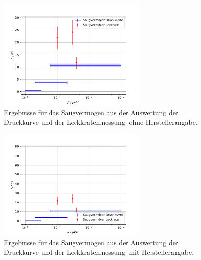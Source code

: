 \begin{figure}[h]
  \centering
  \includegraphics[width=0.65\textwidth]{../Messdaten/plots/turbo/turbo_leck_und_druck_ohne_hersteller.pdf}
  \caption{Ergebnisse für das Saugvermögen aus der Auswertung der Druckkurve und der Leckkratenmessung, ohne Herstellerangabe.}
  \label{fig: dreh_druck_leck_ohne}
\end{figure}

\begin{figure}[h]
  \centering
  \includegraphics[width=0.65\textwidth]{../Messdaten/plots/turbo/turbo_leck_und_druck_mit_hersteller.pdf}
  \caption{Ergebnisse für das Saugvermögen aus der Auswertung der Druckkurve und der Leckkratenmessung, mit Herstellerangabe.}
  \label{fig: dreh_druck_leck_mit}
\end{figure}
